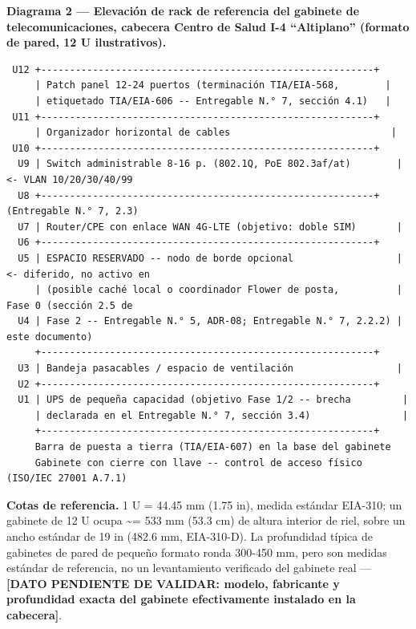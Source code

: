 \documentclass[11pt,a4paper]{article}
\begin{document}
\textbf{Diagrama 2 --- Elevación de rack de referencia del gabinete de telecomunicaciones, cabecera Centro de Salud I-4 ``Altiplano'' (formato de pared, 12 U ilustrativos).}

\begin{samepage}\begin{verbatim}
 U12 +----------------------------------------------------------+
     | Patch panel 12-24 puertos (terminación TIA/EIA-568,        |
     | etiquetado TIA/EIA-606 -- Entregable N.° 7, sección 4.1)   |
 U11 +----------------------------------------------------------+
     | Organizador horizontal de cables                            |
 U10 +----------------------------------------------------------+
  U9 | Switch administrable 8-16 p. (802.1Q, PoE 802.3af/at)        |  <- VLAN 10/20/30/40/99
  U8 +----------------------------------------------------------+     (Entregable N.° 7, 2.3)
  U7 | Router/CPE con enlace WAN 4G-LTE (objetivo: doble SIM)       |
  U6 +----------------------------------------------------------+
  U5 | ESPACIO RESERVADO -- nodo de borde opcional                  |  <- diferido, no activo en
     | (posible caché local o coordinador Flower de posta,          |     Fase 0 (sección 2.5 de
  U4 | Fase 2 -- Entregable N.° 5, ADR-08; Entregable N.° 7, 2.2.2) |     este documento)
     +----------------------------------------------------------+
  U3 | Bandeja pasacables / espacio de ventilación                  |
  U2 +----------------------------------------------------------+
  U1 | UPS de pequeña capacidad (objetivo Fase 1/2 -- brecha         |
     | declarada en el Entregable N.° 7, sección 3.4)                |
     +----------------------------------------------------------+
     Barra de puesta a tierra (TIA/EIA-607) en la base del gabinete
     Gabinete con cierre con llave -- control de acceso físico (ISO/IEC 27001 A.7.1)
\end{verbatim}\end{samepage}

\textbf{Cotas de referencia.} 1 U = 44.45 mm (1.75 in), medida estándar EIA-310; un gabinete de 12 U ocupa \textasciitilde= 533 mm (53.3 cm) de altura interior de riel, sobre un ancho estándar de 19 in (482.6 mm, EIA-310-D). La profundidad típica de gabinetes de pared de pequeño formato ronda 300-450 mm, pero son medidas estándar de referencia, no un levantamiento verificado del gabinete real --- \textbf{{[}DATO PENDIENTE DE VALIDAR: modelo, fabricante y profundidad exacta del gabinete efectivamente instalado en la cabecera{]}}.
\end{document}
